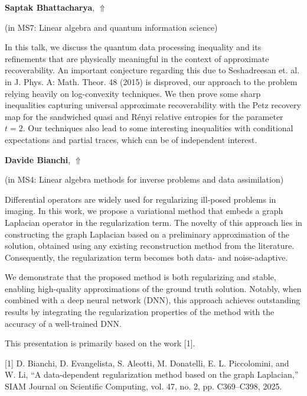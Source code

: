 \documentclass[ILAS2025-program.tex]{subfiles}
\begin{document}
\hypertarget{down0207}{}\begin{ilasabstract}
    
\textbf{Saptak Bhattacharya},  \hfill \hyperlink{up0207}{$\Uparrow$}
    
    
(in {\color{mstitle}MS7: Linear algebra and quantum information science})
        
\mtskip
    In this talk, we discuss the quantum data processing inequality and its refinements that are physically meaningful in the context of approximate recoverability. An important conjecture regarding this due to Seshadreesan et. al. in J. Phys. A: Math. Theor. 48 (2015) is disproved, our approach to the problem relying heavily on log-convexity techniques. We then prove some sharp inequalities capturing universal approximate recoverability with the Petz recovery map for the sandwiched quasi and R\'enyi relative entropies for the parameter $t =2$. Our techniques also lead to some interesting inequalities with conditional expectations and partial traces, which can be of independent interest.

\end{ilasabstract}
    

\hypertarget{down0201}{}\begin{ilasabstract}
    
\textbf{Davide Bianchi},  \hfill \hyperlink{up0201}{$\Uparrow$}
    
    
(in {\color{mstitle}MS4: Linear algebra methods for inverse problems and data assimilation})
        
\mtskip
    Differential operators are widely used for regularizing ill-posed problems in imaging. In this work, we propose a variational method that embeds a graph Laplacian operator in the regularization term. The novelty of this approach lies in constructing the graph Laplacian based on a preliminary approximation of the solution, obtained using any existing reconstruction method from the literature. Consequently, the regularization term becomes both data- and noise-adaptive.

We demonstrate that the proposed method is both regularizing and stable, enabling high-quality approximations of the ground truth solution. Notably, when combined with a deep neural network (DNN), this approach achieves outstanding results by integrating the regularization properties of the method with the accuracy of a well-trained DNN. 

This presentation is primarily based on the work [1].

[1] D. Bianchi, D. Evangelista, S. Aleotti, M. Donatelli, E. L. Piccolomini, and W. Li, “A data-dependent regularization method based on the graph Laplacian,” SIAM Journal on Scientific Computing, vol. 47, no. 2, pp. C369–C398, 2025.
\end{ilasabstract}
    
\end{document}
